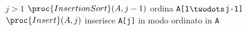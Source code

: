 \begin{codebox}
\li \If $j > 1$
\li     \Then
		$\proc{InsertionSort}(A,j-1)$
        \Comment ordina \texttt{A[1$\twodots$j-1]}
\li         $\proc{Insert}(A,j)$
        \Comment inserisce \texttt{A[j]} in modo ordinato in \texttt{A}
        \End
\end{codebox}
